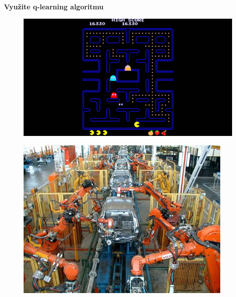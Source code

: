 \documentclass[xcolor=dvipsnames]{beamer}
\begin{document}
\begin{frame}{\bf Využite q-learning algoritmu}
\begin{minipage}{.5\textwidth}
  \begin{figure}[!htb]
  \centering
  \includegraphics[scale=.08]{../pictures/pacman.jpg}
  \end{figure}

  \begin{figure}[!htb]
  \centering
  \includegraphics[scale=.25]{../pictures/assembly_line.jpg}
  \end{figure}


\end{minipage}


\end{frame}
\end{document}

